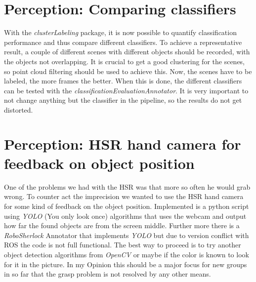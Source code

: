 \documentclass[main.tex]{subfiles}
\begin{document}
		\section{Perception: Comparing classifiers}
		With the \textit{clusterLabeling} package, it is now possible to quantify classification performance and thus compare different classifiers. To achieve a 					representative result, a couple of different scenes with different objects should be recorded, with the objects not overlapping. It is crucial to get a
		good clustering for the scenes, so point cloud filtering should be used to achieve this. Now, the scenes have to be labeled, the more frames the better. 
		When this is done, the different classifiers can be tested with the \textit{classificationEvaluationAnnotator}. It is very important to not change anything but 
		the classifier in the pipeline, so the results do not get distorted.
		
		\section{Perception: HSR hand camera for feedback on object position}
One of the problems we had with the HSR was that more so often he would grab wrong.
To counter act the imprecision we wanted to use the HSR hand camera for some kind of feedback on the object position.
Implemented is a python script using \textit{YOLO} (You only look once) algorithms that uses the webcam and output how far the found objects are from the screen middle.
Further more there is a \textit{RoboSherlock} Annotator that implements \textit{YOLO} but due to version conflict with ROS the code is not full functional.
The best way to proceed is to try another object detection algorithms from \textit{OpenCV} or maybe if the color is known to look for it in the picture.
In my Opinion this should be a major focus for new groups in so far that the grasp problem is not resolved by any other means.

\end{document}
